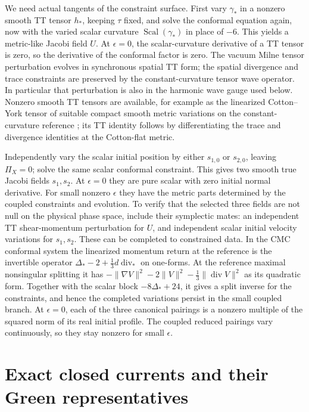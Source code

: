 \documentclass[11pt]{article}
\newcommand{\divg}{\operatorname{div}}
\numberwithin{equation}{section}
\begin{document}
We need actual tangents of the constraint surface. First vary
\(\gamma_*\) in a nonzero smooth TT tensor \(h_*\), keeping
\(\tau\) fixed, and solve the conformal equation again, now with
the varied scalar curvature \(\operatorname{Scal}(\gamma_*)\)
in place of \(-6\). This yields a metric-like Jacobi field \(U\).
At \(\epsilon=0\), the scalar-curvature derivative of a TT tensor
is zero, so the derivative of the conformal factor is zero.
The vacuum Milne tensor perturbation evolves in synchronous
spatial TT form; the spatial divergence and trace constraints
are preserved by the constant-curvature tensor wave operator.
In particular that perturbation is also in the harmonic wave
gauge used below. Nonzero smooth TT tensors are available, for
example as the linearized Cotton--York tensor of suitable compact
smooth metric variations on the constant-curvature reference
\cite{beig}; its TT identity follows by differentiating the
trace and divergence identities at the Cotton-flat metric.

Independently vary the scalar initial position by either
\(s_{1,0}\) or \(s_{2,0}\), leaving \(\Pi_X=0\); solve the same
scalar conformal constraint. This gives two smooth true
Jacobi fields \(s_1,s_2\). At \(\epsilon=0\) they are pure
scalar with zero initial normal derivative. For small nonzero
\(\epsilon\) they have the metric parts determined by the
coupled constraints and evolution. To verify that the selected
three fields are not null on the physical phase space, include
their symplectic mates: an independent TT shear-momentum
perturbation for \(U\), and independent scalar initial
velocity variations for \(s_1,s_2\). These can be completed
to constrained data. In the CMC conformal system the
linearized momentum return at the reference is the invertible
operator \(\Delta_*-2+\tfrac13 d\divg_*\) on one-forms.
At the reference maximal nonsingular splitting it has
\(-\|\nabla V\|^2-2\|V\|^2-\tfrac13\|\divg V\|^2\)
as its quadratic form. Together with the scalar block
\(-8\Delta_*+24\), it gives a split inverse for the constraints,
and hence the completed variations persist in the small
coupled branch. At \(\epsilon=0\), each of the three
canonical pairings is a nonzero multiple of the squared
norm of its real initial profile. The coupled reduced
pairings vary continuously, so they stay nonzero for small
\(\epsilon\).

\section{Exact closed currents and their Green representatives}
\end{document}

